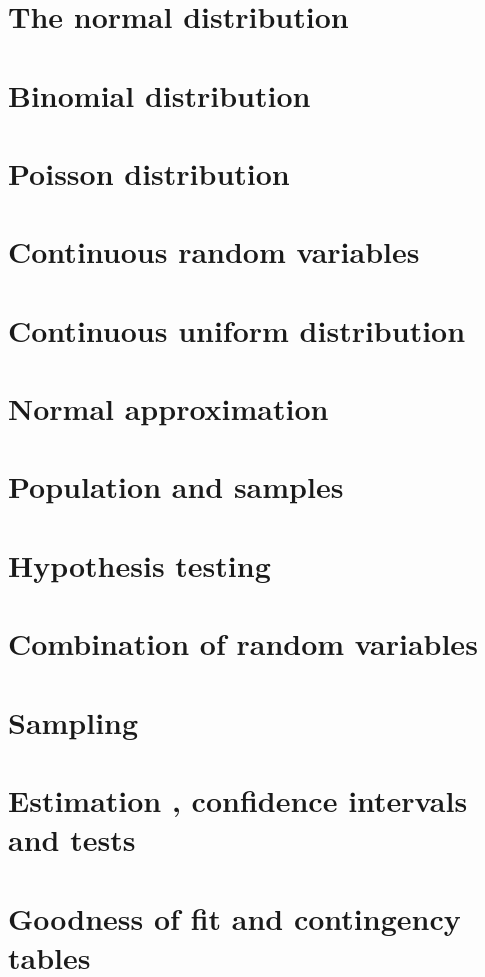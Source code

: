 \documentclass[a4paper]{article}
\begin{document}
\section{The normal distribution}

\section{Binomial distribution}

\section{Poisson distribution}

\section{Continuous random variables}

\section{Continuous uniform distribution}

\section{Normal approximation}

\section{Population and samples}

\section{Hypothesis testing}

\section{Combination of random variables}

\section{Sampling}

\section{Estimation , confidence intervals and tests}

\section{Goodness of fit and contingency tables}
\end{document}
